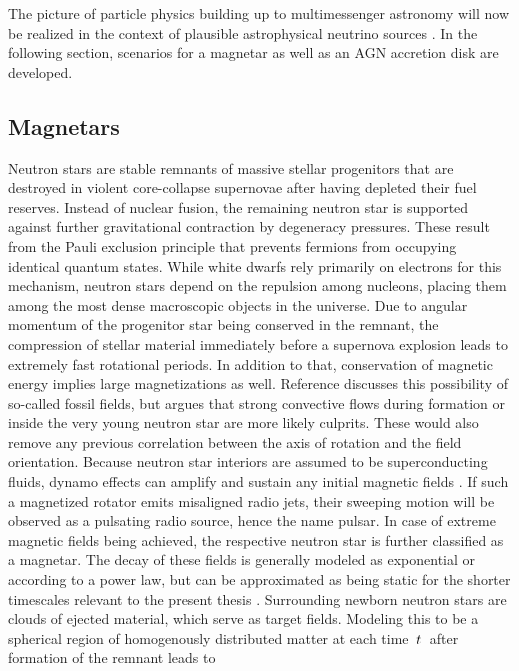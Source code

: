 The picture of particle physics building up to multimessenger astronomy will now be realized in the context of plausible astrophysical
neutrino sources \cite{Becker_2008}. In the following section, scenarios for a magnetar as well as an AGN accretion disk are developed.



\subsection{Magnetars}
\label{sub:magnetars}

Neutron stars are stable remnants of massive stellar progenitors that are destroyed in violent core-collapse supernovae after having
depleted their fuel reserves. Instead of nuclear fusion, the remaining neutron star is supported against further gravitational
contraction by degeneracy pressures. These result from the Pauli exclusion principle that prevents fermions from occupying identical
quantum states. While white dwarfs rely primarily on electrons for this mechanism, neutron stars depend on the repulsion among
nucleons, placing them among the most dense macroscopic objects in the universe. Due to angular momentum of the progenitor
star being conserved in the remnant, the compression of stellar material immediately before a supernova explosion leads to
extremely fast rotational periods. In addition to that, conservation of magnetic energy implies large magnetizations as well.
Reference \cite{Thompson_1993} discusses this possibility of so-called fossil fields, but argues that strong convective flows
during formation or inside the very young neutron star are more likely culprits. These would also remove any previous correlation
between the axis of rotation and the field orientation. Because neutron star interiors are assumed to be superconducting fluids,
dynamo effects can amplify and sustain any initial magnetic fields \cite{Haskell_2018}. If such a magnetized rotator emits misaligned
radio jets, their sweeping motion will be observed as a pulsating radio source, hence the name pulsar. In case of extreme magnetic
fields being achieved, the respective neutron star is further classified as a magnetar. The decay of these fields is generally modeled
as exponential or according to a power law, but can be approximated as being static for the shorter timescales relevant to the present
thesis \cite{Sang_1990}. Surrounding newborn neutron stars are clouds of ejected material, which serve as target fields. Modeling this
to be a spherical region of homogenously distributed matter at each time~$t \kern+0.5pt$~after formation of the remnant leads to
